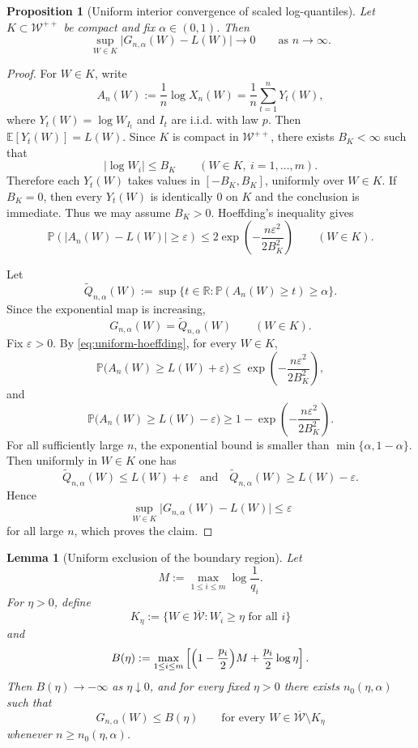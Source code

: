 \documentclass[11pt]{article}
\newtheorem{proposition}[proposition]{Proposition}
\newtheorem{lemma}[lemma]{Lemma}
\theoremstyle{definition}
\newcommand{\R}{\mathbb{R}}
\newcommand{\E}{\mathbb{E}}
\newcommand{\Prob}{\mathbb{P}}
\newcommand{\1}{\mathbf{1}}
\begin{document}
\begin{proposition}[Uniform interior convergence of scaled log-quantiles]\label{prop:uniform-interior}
Let $K\subset \mathcal W^{++}$ be compact and fix $\alpha\in(0,1)$. Then
\[
\sup_{W\in K} \bigl|G_{n,\alpha}(W)-L(W)\bigr|\to 0
\qquad\text{as } n\to\infty.
\]
\end{proposition}

\begin{proof}
For $W\in K$, write
\[
A_n(W):=\frac1n \log X_n(W)=\frac1n\sum_{t=1}^n Y_t(W),
\]
where $Y_t(W)=\log W_{I_t}$ and $I_t$ are i.i.d. with law $p$. Then $\E[Y_t(W)]=L(W)$. Since $K$ is compact in $\mathcal W^{++}$, there exists $B_K<\infty$ such that
\[
|\log W_i|\le B_K
\qquad (W\in K,\ i=1,\dots,m).
\]
Therefore each $Y_t(W)$ takes values in $[-B_K,B_K]$, uniformly over $W\in K$. If $B_K=0$, then every $Y_t(W)$ is identically $0$ on $K$ and the conclusion is immediate. Thus we may assume $B_K>0$. Hoeffding's inequality \cite{Hoeffding1963} gives
\begin{equation}\label{eq:uniform-hoeffding}
\Prob\!\left(\bigl|A_n(W)-L(W)\bigr|\ge \varepsilon\right)
\le 2\exp\!\left(-\frac{n\varepsilon^2}{2B_K^2}\right)
\qquad (W\in K).
\end{equation}

Let
\[
\widetilde Q_{n,\alpha}(W):=\sup\{t\in\R: \Prob(A_n(W)\ge t)\ge \alpha\}.
\]
Since the exponential map is increasing,
\[
G_{n,\alpha}(W)=\widetilde Q_{n,\alpha}(W)
\qquad (W\in K).
\]
Fix $\varepsilon>0$. By \eqref{eq:uniform-hoeffding}, for every $W\in K$,
\[
\Prob\bigl(A_n(W)\ge L(W)+\varepsilon\bigr)
\le \exp\!\left(-\frac{n\varepsilon^2}{2B_K^2}\right),
\]
and
\[
\Prob\bigl(A_n(W)\ge L(W)-\varepsilon\bigr)
\ge 1-\exp\!\left(-\frac{n\varepsilon^2}{2B_K^2}\right).
\]
For all sufficiently large $n$, the exponential bound is smaller than $\min\{\alpha,1-\alpha\}$. Then uniformly in $W\in K$ one has
\[
\widetilde Q_{n,\alpha}(W)\le L(W)+\varepsilon
\quad\text{and}\quad
\widetilde Q_{n,\alpha}(W)\ge L(W)-\varepsilon.
\]
Hence
\[
\sup_{W\in K} \bigl|G_{n,\alpha}(W)-L(W)\bigr|\le \varepsilon
\]
for all large $n$, which proves the claim.
\end{proof}

\begin{lemma}[Uniform exclusion of the boundary region]\label{lem:boundary-exclusion}
Let
\[
M:=\max_{1\le i\le m} \log \frac1{q_i}.
\]
For $\eta>0$, define
\[
K_\eta:=\{W\in \overline{\mathcal W}: W_i\ge \eta \text{ for all } i\}
\]
and
\[
B(\eta):=\max_{1\le i\le m}\left[\Bigl(1-\frac{p_i}{2}\Bigr)M+\frac{p_i}{2}\log \eta\right].
\]
Then $B(\eta)\to -\infty$ as $\eta\downarrow 0$, and for every fixed $\eta>0$ there exists $n_0(\eta,\alpha)$ such that
\[
G_{n,\alpha}(W)\le B(\eta)
\qquad\text{for every } W\in \overline{\mathcal W}\setminus K_\eta
\]
whenever $n\ge n_0(\eta,\alpha)$.
\end{lemma}
\end{document}
